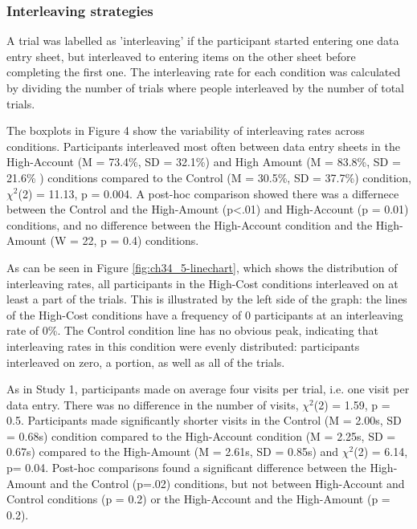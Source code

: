 \subsubsection{Interleaving strategies}
A trial was labelled as 'interleaving' if the participant started entering one data entry sheet, but interleaved to entering items on the other sheet before completing the first one. The interleaving rate for each condition was calculated by dividing the number of trials where people interleaved by the number of total trials. 

The boxplots in Figure 4 show the variability of interleaving rates across conditions. Participants interleaved most often between data entry sheets in the High-Account (M = 73.4\%, SD = 32.1\%) and High Amount (M = 83.8\%, SD = 21.6\% ) conditions compared to the Control (M = 30.5\%, SD = 37.7\%) condition, $\chi^2$(2) = 11.13, p = 0.004. A post-hoc comparison showed there was a differnece between the Control and the High-Amount (p<.01) and High-Account (p = 0.01) conditions, and no difference between the High-Account condition and the High-Amount (W = 22, p = 0.4) conditions.

As can be seen in Figure \ref{fig:ch34_5-linechart}, which shows the distribution of interleaving rates, all participants in the High-Cost conditions interleaved on at least a part of the trials. This is illustrated by the left side of the graph: the lines of the High-Cost conditions have a frequency of 0 participants at an interleaving rate of 0\%. The Control condition line has no obvious peak, indicating that interleaving rates in this condition were evenly distributed: participants interleaved on zero, a portion, as well as all of the trials.

As in Study 1, participants made on average four visits per trial, i.e. one visit per data entry. There was no difference in the number of visits, $\chi^2$(2) = 1.59, p = 0.5. Participants made significantly shorter visits in the Control (M = 2.00s, SD = 0.68s) condition compared to the High-Account condition (M = 2.25s, SD = 0.67s) compared to the High-Amount (M = 2.61s, SD = 0.85s) and  $\chi^2$(2) = 6.14, p= 0.04. Post-hoc comparisons found a significant difference between  the High-Amount and the Control (p=.02) conditions, but not between High-Account and Control conditions (p = 0.2) or the High-Account and the High-Amount (p = 0.2).

